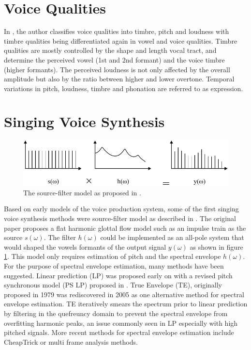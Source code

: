 \section{Voice Qualities}

In \cite{sundberg_perceptual_1994}, the author classifies voice qualities into timbre, pitch and loudness with timbre qualities being differentiated again in vowel and voice qualities. 
Timbre qualities are mostly controlled by the shape and length vocal tract, and determine the perceived vowel (1st and 2nd formant) and the voice timbre (higher formants). The perceived loudness is not only affected by the overall amplitude but also by the ratio between higher and lower overtone. Temporal variations in pitch, loudness, timbre and phonation are referred to as expression. 

\section{Singing Voice Synthesis}

\begin{figure}[H]
    \centering
    \includegraphics{Graphics/003_SourceFilter_1960.pdf}
    \caption{The source-filter model as proposed in \cite{fant_acoustic_1960}.}
    \label{fig:source_filter}
\end{figure}

Based on early models of the voice production system, some of the first singing voice synthesis methods were source-filter model as described in \cite{fant_acoustic_1960}. The original paper proposes a flat harmonic glottal flow model such as an impulse train as the source $s(\omega)$. The filter $h(\omega)$ could be implemented as an all-pole system that would shaped the vowels formants of the output signal $y(\omega)$ as shown in figure \ref{fig:source_filter}. This model only requires estimation of pitch and the spectral envelope $h(\omega)$. For the purpose of spectral envelope estimation, many methods have been suggested. Linear prediction (LP) was proposed early on \cite{makhoul_linear_1975} with a revised pitch synchronous model (PS LP) proposed in \cite{guerchi_pitch-synchronous_2000}. True Envelope (TE), originally proposed in 1979 \cite{imai_spectral_1979} was rediscovered in 2005 \cite{roebel_efficient_2005}\cite{villavicencio_improving_2006} as one alternative method for spectral envelope estimation. TE iteratively smears the spectrum prior to linear prediction by filtering in the quefreuncy domain to prevent the spectral envelope from overfitting harmonic peaks, an issue commonly seen in LP especially with high pitched signals. More recent methods for spectral envelope estimation include CheapTrick \cite{morise_cheaptrick_2015} or multi frame analysis methods\cite{degottex_simple_2016}.\\

